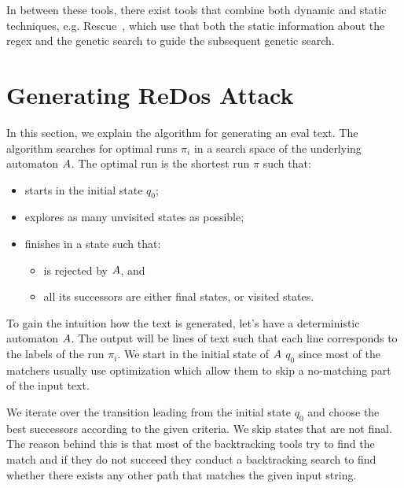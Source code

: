 \documentclass[acmsmall,screen]{acmart}
\begin{document}
In between these tools, there exist tools that combine both dynamic and static techniques,
e.g. Rescue~\cite{rescue}, which use that both the static information about the regex
and the genetic search to guide the subsequent genetic search.





\section{Generating ReDos Attack}\label{sec:genText}
In this section, we explain the algorithm for generating an eval text. The algorithm searches for optimal runs $\pi_i$ in a search space of the underlying automaton $A$. The optimal run is the shortest run $\pi$ such that:

\begin{itemize}
 \item starts in the initial state $q_0$;
\item explores as many unvisited states as possible;
\item finishes in a state such that:
   \begin{itemize}
     \item is rejected by $A$, and
	\item all its successors are either final states, or visited states.
      \end{itemize}
 \end{itemize}

To gain the intuition how the text is generated, let's have a deterministic automaton $A$. 
%
The output will be lines of text such that each line corresponds to the labels of the run $\pi_i$.
%
We start in the initial state of $A$ $q_0$ since most of the matchers usually use optimization which allow them to skip a no-matching part of the input text.
%

We iterate over the transition leading from the initial state $q_0$ and choose the best successors according to the given criteria. 
%
We skip states that are not final. 
%
The reason behind this is that most of the backtracking tools try to find the match and if they do not succeed 
%
they conduct a backtracking search to find whether there exists any other path that matches the given input string.
%
\end{document}

